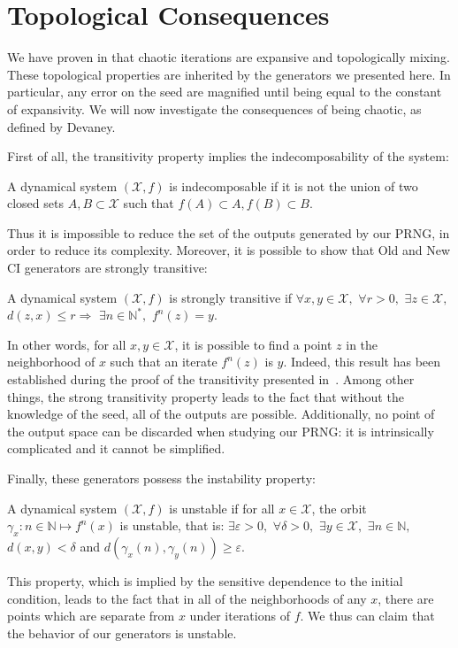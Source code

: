 \section{Topological Consequences}

We have proven in \cite{gfb10:ip} that chaotic iterations are expansive and topologically mixing. These topological properties are inherited by the generators we presented here. In particular, any error on the seed are magnified until being equal to the constant of expansivity.
We will now investigate the consequences of being chaotic, as defined by Devaney. 

First of all, the transitivity property implies the indecomposability of the system:

\begin{definition}
A dynamical system $\left( \mathcal{X}, f\right)$ is indecomposable if it is not the union of two closed sets $A, B \subset \mathcal{X}$ such that $f(A) \subset A, f(B) \subset B$.
\end{definition}

Thus it is impossible to reduce the set of the outputs generated by our PRNG, in order to reduce its complexity. Moreover, it is possible to show that Old and New CI generators are strongly transitive:

\begin{definition}
A dynamical system $\left( \mathcal{X}, f\right)$ is strongly transitive if $\forall x,y \in \mathcal{X},$ $\forall r > 0,$ $\exists z \in \mathcal{X},$ $d(z,x) \leqslant r \Rightarrow$ $\exists n \in \mathds{N}^*,$ $f^n(z)=y$.
\end{definition}

In other words, for all $x,y \in \mathcal{X}$, it is possible to find a point $z$ in the neighborhood of $x$ such that an iterate $f^n(z)$ is $y$. Indeed, this result has been established during the proof of the transitivity presented in~\cite{guyeux09}. Among other things, the strong transitivity property leads to the fact that without the knowledge of the seed, all of the outputs are possible. Additionally, no point of the output space can be discarded when studying our PRNG: it is intrinsically complicated and it cannot be simplified.

Finally, these generators possess the instability property:

\begin{definition}
A dynamical system $\left( \mathcal{X}, f\right)$ is unstable if for all $x \in \mathcal{X}$, the orbit $\gamma_x:n \in \mathds{N} \longmapsto f^n(x)$ is unstable, that is: $\exists \varepsilon > 0,$ $\forall \delta > 0,$ $\exists y \in \mathcal{X},$ $\exists n \in \mathds{N},$ $d(x,y) < \delta$ and $d\left(\gamma_x(n), \gamma_y(n)\right) \geqslant \varepsilon.$
\end{definition}

This property, which is implied by the sensitive dependence to the initial condition, leads to the fact that in all of the neighborhoods of any $x$, there are points which are separate from $x$ under iterations of $f$. We thus can claim that the behavior of our generators is unstable.

